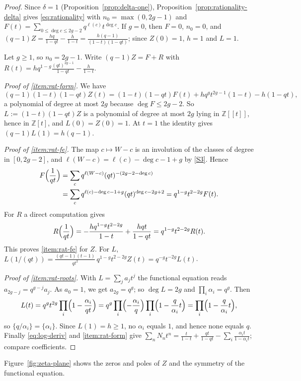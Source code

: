 \documentclass[11pt]{amsbook}
\theoremstyle{plain}
\theoremstyle{definition}
\theoremstyle{remark}
\numberwithin{equation}{section}
\numberwithin{figure}{chapter}
\numberwithin{table}{chapter}
\newcommand{\Z}{\mathbb{Z}}
\begin{document}
\begin{proof}
Since $\delta=1$ (Proposition~\ref{prop:delta-one}),
Proposition~\ref{prop:rationality-delta} gives
\eqref{eq:rationality} with $n_0=\max(0,2g-1)$ and
$F(t)=\sum_{0\le\deg c\le2g-2}q^{\ell(c)}t^{\deg c}$. If $g=0$,
then $F=0$, $n_0=0$, and
$(q-1)Z=\frac{hq}{1-qt}-\frac h{1-t}=\frac{h(q-1)}{(1-t)(1-qt)}$;
since $Z(0)=1$, $h=1$ and $L=1$.

Let $g\ge1$, so $n_0=2g-1$. Write $(q-1)Z=F+R$ with
$R(t)=hq^{1-g}\frac{(qt)^{2g-1}}{1-qt}-\frac h{1-t}$.

\emph{Proof of \eqref{item:rat-form}.} We have
\[
(q-1)(1-t)(1-qt)Z(t)=(1-t)(1-qt)F(t)+hq^gt^{2g-1}(1-t)-h(1-qt),
\]
a polynomial of degree at most $2g$ because $\deg F\le2g-2$. So
$L:=(1-t)(1-qt)Z$ is a polynomial of degree at most $2g$ lying in
$\Z[[t]]$, hence in $\Z[t]$, and $L(0)=Z(0)=1$. At $t=1$ the
identity gives $(q-1)L(1)=h(q-1)$.

\emph{Proof of \eqref{item:rat-fe}.} The map $c\mapsto W-c$ is an
involution of the classes of degree in $[0,2g-2]$, and
$\ell(W-c)=\ell(c)-\deg c-1+g$ by \ref{S3}. Hence
\begin{align*}
F\Bigl(\frac1{qt}\Bigr)
&=\sum_cq^{\ell(W-c)}(qt)^{-(2g-2-\deg c)}\\
&=\sum_cq^{\ell(c)-\deg c-1+g}(qt)^{\deg c-2g+2}
=q^{1-g}t^{2-2g}F(t).
\end{align*}
For $R$ a direct computation gives
\[
R\Bigl(\frac1{qt}\Bigr)
=-\frac{hq^{1-g}t^{2-2g}}{1-t}+\frac{hqt}{1-qt}
=q^{1-g}t^{2-2g}R(t).
\]
This proves \eqref{item:rat-fe} for $Z$. For $L$,
$L(1/(qt))=\frac{(qt-1)(t-1)}{qt^2}\,q^{1-g}t^{2-2g}Z(t)
=q^{-g}t^{-2g}L(t)$.

\emph{Proof of \eqref{item:rat-roots}.} With $L=\sum_ja_jt^j$ the
functional equation reads $a_{2g-j}=q^{g-j}a_j$. As $a_0=1$, we get
$a_{2g}=q^g$; so $\deg L=2g$ and $\prod_i\alpha_i=q^g$. Then
\[
L(t)=q^gt^{2g}\prod_i\Bigl(1-\frac{\alpha_i}{qt}\Bigr)
=q^g\prod_i\Bigl(-\frac{\alpha_i}q\Bigr)
\prod_i\Bigl(1-\frac q{\alpha_i}t\Bigr)
=\prod_i\Bigl(1-\frac q{\alpha_i}t\Bigr),
\]
so $\{q/\alpha_i\}=\{\alpha_i\}$. Since $L(1)=h\ge1$, no $\alpha_i$
equals $1$, and hence none equals $q$. Finally \eqref{eq:log-deriv}
and \eqref{item:rat-form} give
$\sum_nN_nt^n=\frac t{1-t}+\frac{qt}{1-qt}
-\sum_i\frac{\alpha_it}{1-\alpha_it}$; compare coefficients.
\end{proof}

Figure~\ref{fig:zeta-plane} shows the zeros and poles of $Z$ and the
symmetry of the functional equation.
\end{document}
